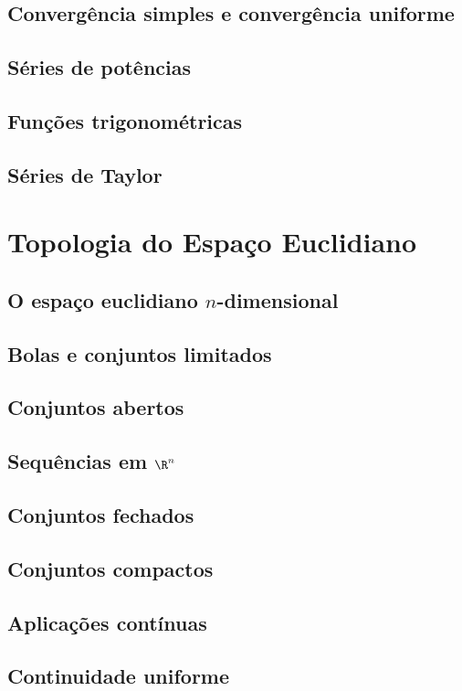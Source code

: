 \documentclass{article}
\begin{document}
\subsection{Convergência simples e convergência uniforme}
\subsection{Séries de potências}
\subsection{Funções trigonométricas}
\subsection{Séries de Taylor}

\section{Topologia do Espaço Euclidiano}
\subsection{O espaço euclidiano \(n\)-dimensional}
\subsection{Bolas e conjuntos limitados}
\subsection{Conjuntos abertos}
\subsection{Sequências em \(\R^n\)}
\subsection{Conjuntos fechados}
\subsection{Conjuntos compactos}
\subsection{Aplicações contínuas}
\subsection{Continuidade uniforme}
\end{document}
